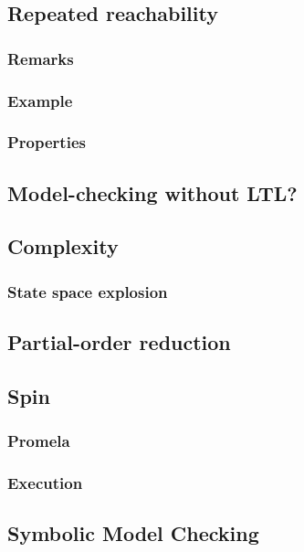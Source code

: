 \documentclass[12pt, a4paper]{book}
\begin{document}
  \subsection{Repeated reachability}
  \label{sub:Repeated reachability}
  \subsubsection{Remarks}
  \label{subs:Remarks}
  \subsubsection{Example}
  \label{subs:Example}
  \subsubsection{Properties}
  \label{subs:Properties}
  \subsection{Model-checking without LTL?}
  \label{sub:Model-checking without LTL?}
  \subsection{Complexity}
  \label{sub:Complexity}
  \subsubsection{State space explosion}
  \label{subs:State space explosion}
  \subsection{Partial-order reduction}
  \label{sub:Partial-order reduction}
  \subsection{Spin}
  \label{sub:Spin}
  \subsubsection{Promela}
  \label{subs:Promela}
  \subsubsection{Execution}
  \label{subs:Execution}
  \subsection{Symbolic Model Checking}
  \label{sub:Symbolic Model Checking}
\end{document}
